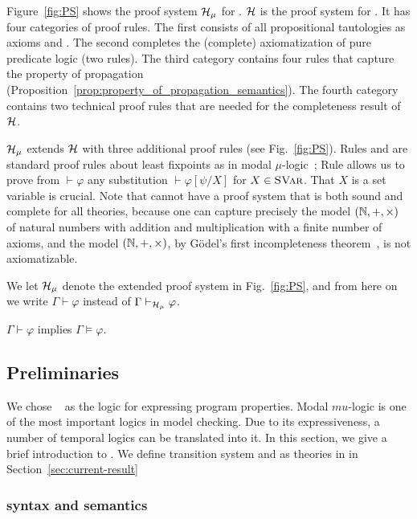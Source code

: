\documentclass{almostllncs}
\begin{document}
Figure~\ref{fig:PS} shows the proof system $\PS_\mu$ for \mmul.
$\mathcal{H}$ is the proof system for \ml.
It has four categories of proof rules.
The first consists of all propositional tautologies as axioms and .
The second completes the (complete) axiomatization of pure predicate logic (two rules).
The third category contains four rules that capture the property of propagation
(Proposition~\ref{prop:property_of_propagation_semantics}).
The fourth category contains two technical proof rules that are needed for the completeness result of $\mathcal{H}$.

$\PS_\mu$ extends $\mathcal{H}$ with three additional proof rules (see Fig.~\ref{fig:PS}).
Rules  and  are standard
proof rules about least fixpoints as in modal $\mu$-logic~\cite{Koz82};
Rule  allows us to prove from $\vdash \varphi$
any substitution $\vdash \varphi[\psi/X]$ for $X \in {\normalfont\textsc{SVar}}$.
That $X$ is a set variable is crucial.
Note that \mmul cannot have a proof system that is both sound and complete for all theories, because one can capture precisely the model $(\mathbb{N},+,\times)$ of natural numbers with addition and multiplication with a finite number of \mmul axioms, and the model $(\mathbb{N},+,\times)$, by G\"odel's first incompleteness theorem~\cite{Goe92}, is not axiomatizable.

We let $\PS_\mu$ denote the extended proof system in Fig.~\ref{fig:PS},
and from here on we write $\Gamma \vdash \varphi$ instead of
$\Gamma \vdash_{\mathcal{H}_\mu} \varphi$.

\begin{theorem}[Soundness of $\PS_\mu$]\label{thm:soundness_MmL}
	$\Gamma \vdash \varphi$ implies $\Gamma \vDash \varphi$.
\end{theorem}

\subsection{\ModmuL Preliminaries}

We chose \modmul~\cite{Koz82} as the logic for expressing program properties.
Modal $mu$-logic is one of the most important logics in model checking.
Due to its expressiveness, a number of temporal logics can be translated into it.
In this section, we give a brief introduction to \mmul.
We define transition system and \modmul as theories in \mmul in Section~\ref{sec:current-result}

\subsubsection{\ModmuL syntax and semantics}
\end{document}
